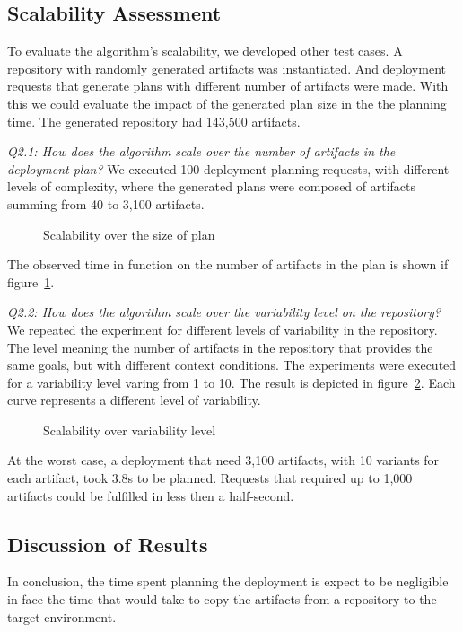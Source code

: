 \subsection{Scalability Assessment}

To evaluate the algorithm's scalability, we developed other test cases.  A repository with randomly generated artifacts was instantiated. And deployment requests that generate plans with different number of artifacts were made. With this we could evaluate the impact of the generated plan size in the the planning time.
The generated repository had 143,500 artifacts.

\emph{Q2.1: How does the algorithm scale over the number of artifacts in the deployment plan?} We executed 100 deployment planning requests, with different levels of complexity, where the generated plans were composed of artifacts summing from 40 to 3,100 artifacts.

\begin{figure}[!htb]
  \centering
  \caption{Scalability over the size of plan}
\label{graph_plan_size_and_time}
\end{figure}

The observed time in function on the number of artifacts in the plan is shown if figure~\ref{graph_plan_size_and_time}.

\emph{Q2.2:  How does the algorithm scale over the variability level on the repository?} We repeated the experiment for different levels of variability in the repository.
The level meaning the number of artifacts in the repository that provides the same goals, but with different context conditions. The experiments were executed for a variability level varing from 1 to 10.
The result is depicted in figure~\ref{graph_scalability}. Each curve represents a different level of variability.

\begin{figure}[!htb]
  \centering
  \caption{Scalability over variability level}
\label{graph_scalability}
\end{figure}

At the worst case, a deployment that need 3,100 artifacts, with 10 variants for each artifact, took 3.8s to be planned. Requests that required up to 1,000 artifacts could be fulfilled in less then a half-second.

\subsection{Discussion of Results}

In conclusion, the time spent planning the deployment is expect to be negligible in face the time that would take to copy the artifacts from a repository to the target environment.
